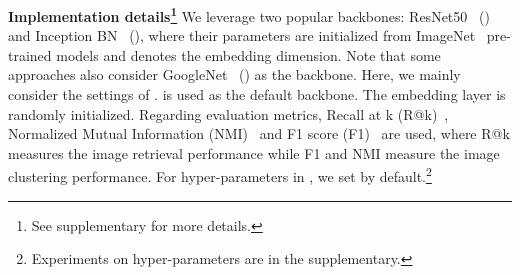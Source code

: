 \documentclass[runningheads]{llncs}
\begin{document}
\noindent\textbf{Implementation details\footnote{See supplementary for more details.}} We leverage two popular backbones: ResNet50~\cite{he2016deep} () and Inception BN~\cite{ioffe2015batch} (), where their parameters are initialized from ImageNet~\cite{deng2009imagenet} pre-trained models and  denotes the embedding dimension. Note that some approaches also consider GoogleNet~\cite{szegedy2015going} () as the backbone. Here, we mainly consider the settings of .  is used as the default backbone. The embedding layer is randomly initialized. Regarding evaluation metrics, Recall at k (R@k)~\cite{jegou2010product}, Normalized Mutual Information (NMI)~\cite{schutze2008introduction} and F1 score (F1)~\cite{sohn2016improved} are used, where R@k measures the image retrieval performance while F1 and NMI measure the image clustering performance. For hyper-parameters in \shortname, we set  by default.\footnote{Experiments on hyper-parameters  are in the supplementary.} 
\end{document}

